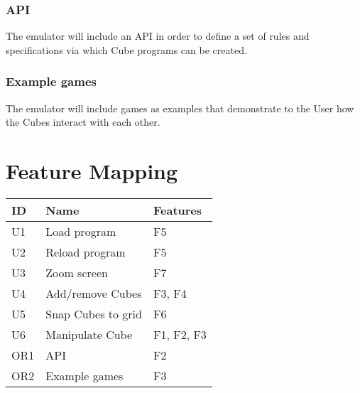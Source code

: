 \documentclass[12pt]{article}
\begin{document}
	\subsubsection{API}
		The emulator will include an API in order to define a set of rules and specifications via which Cube programs can be created.
	
	\subsubsection{Example games}
		The emulator will include games as examples that demonstrate to the User how the Cubes interact with each other.


    \section{Feature Mapping}
    \begin{table}[h!]
        \begin{tabular}{p{.4in} | p{1.75in} | p{.75in}}
        \textbf{ID} &
        \textbf{Name} &
        \textbf{Features} \\ \hline

        U1 &
        Load program &
        F5 \\ \hline

        U2 &
        Reload program &
        F5 \\ \hline

        U3 &
        Zoom screen &
        F7 \\ \hline

        U4 &
        Add/remove Cubes &
        F3, F4 \\ \hline

        U5 &
        Snap Cubes to grid &
        F6 \\ \hline

        U6 &
        Manipulate Cube &
        F1, F2, F3 \\ \hline

        OR1 &
        API &
        F2 \\ \hline

        OR2 &
        Example games &
        F3 \\ \hline

        \end{tabular}
    \end{table}
    
\clearpage
{}
\printglossaries
\clearpage
\end{document}
